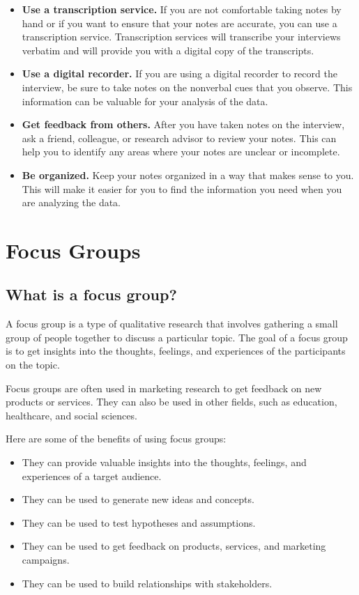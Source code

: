 \documentclass[
  b5paper]{book}
\begin{document}
\begin{itemize}
\item
  \textbf{Use a transcription service.} If you are not comfortable taking notes by hand or if you want to ensure that your notes are accurate, you can use a transcription service. Transcription services will transcribe your interviews verbatim and will provide you with a digital copy of the transcripts.
\item
  \textbf{Use a digital recorder.} If you are using a digital recorder to record the interview, be sure to take notes on the nonverbal cues that you observe. This information can be valuable for your analysis of the data.
\item
  \textbf{Get feedback from others.} After you have taken notes on the interview, ask a friend, colleague, or research advisor to review your notes. This can help you to identify any areas where your notes are unclear or incomplete.
\item
  \textbf{Be organized.} Keep your notes organized in a way that makes sense to you. This will make it easier for you to find the information you need when you are analyzing the data.
\end{itemize}

\hypertarget{focus-groups-1}{%
\chapter{Focus Groups}\label{focus-groups-1}}

\hypertarget{what-is-a-focus-group}{%
\section*{What is a focus group?}\label{what-is-a-focus-group}}

\hfill\break
A focus group is a type of qualitative research that involves gathering a small group of people together to discuss a particular topic. The goal of a focus group is to get insights into the thoughts, feelings, and experiences of the participants on the topic.

Focus groups are often used in marketing research to get feedback on new products or services. They can also be used in other fields, such as education, healthcare, and social sciences.

Here are some of the benefits of using focus groups:

\begin{itemize}
\item
  They can provide valuable insights into the thoughts, feelings, and experiences of a target audience.
\item
  They can be used to generate new ideas and concepts.
\item
  They can be used to test hypotheses and assumptions.
\item
  They can be used to get feedback on products, services, and marketing campaigns.
\item
  They can be used to build relationships with stakeholders.
\end{itemize}
\end{document}
